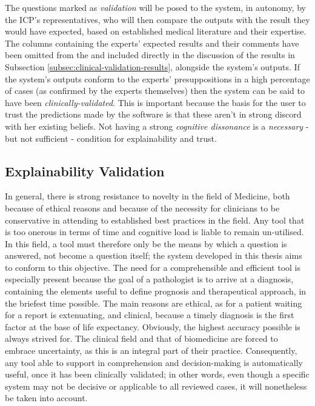 The questions marked as \textit{validation} will be posed to the system, in autonomy, by the ICP's representatives, who will then compare the outputs with the result they would have expected, based on established medical literature and their expertise.
The columns containing the experts' expected results and their comments have been omitted from the  and included directly in the discussion of the results in Subsection \ref{subsec:clinical-validation-results}, alongside the system's outputs.
If the system's outputs conform to the experts' presuppositions in a high percentage of cases (as confirmed by the experts themselves) then the system can be said to have been \textit{clinically-validated}.
This is important because the basis for the user to trust the predictions made by the software is that these aren't in strong discord with her existing beliefs.
Not having a strong \textit{cognitive dissonance} is a \textit{necessary} - but not sufficient - condition for explainability and trust.

\subsection{Explainability Validation} \label{subsec:explainability-validation}
In general, there is strong resistance to novelty in the field of Medicine, both because of ethical reasons and because of the necessity for clinicians to be conservative in attending to established best practices in the field.
Any tool that is too onerous in terms of time and cognitive load is liable to remain un-utilised.
In this field, a tool must therefore only be the means by which a question is answered, not become a question itself; the system developed in this thesis aims to conform to this objective.
The need for a comprehensible and efficient tool is especially present because the goal of a pathologist is to arrive at a diagnosis, containing the elements useful to define prognosis and therapeutical approach, in the briefest time possible.
The main reasons are ethical, as for a patient waiting for a report is extenuating, and clinical, because a timely diagnosis is the first factor at the base of life expectancy.
Obviously, the highest accuracy possible is always strived for.
The clinical field and that of biomedicine are forced to embrace uncertainty, as this is an integral part of their practice.
Consequently, any tool able to support in comprehension and decision-making is automatically useful, once it has been clinically validated; in other words, even though a specific system may not be decisive or applicable to all reviewed cases, it will nonetheless be taken into account.

